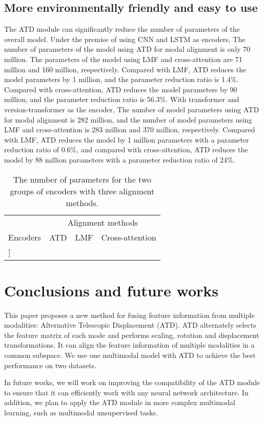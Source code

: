 \documentclass{ecai}
\begin{document}
\subsection{More environmentally friendly and easy to use}
The ATD module can significantly reduce the number of parameters of the overall model. Under the premise of using CNN and LSTM as encoders, The number of parameters of the model using ATD for modal alignment is only 70 million. The parameters of the model using LMF and cross-attention are 71 million and 160 million, respectively. Compared with LMF, ATD reduces the model parameters by 1 million, and the parameter reduction ratio is 1.4\%. Compared with cross-attention, ATD reduces the model parameters by 90 million, and the parameter reduction ratio is 56.3\%. With transformer and version-transformer as the encoder, The number of model parameters using ATD for modal alignment is 282 million, and the number of model parameters using LMF and cross-attention is 283 million and 370 million, respectively. Compared with LMF, ATD reduces the model by 1 million parameters with a parameter reduction ratio of 0.6\%, and compared with cross-attention, ATD reduces the model by 88 million parameters with a parameter reduction ratio of 24\%.
\begin{table}
\begin{center}
{\caption{The number of parameters for the two groups of encoders with three alignment methods.}\label{table3}}
\begin{tabular}{lccc}
\hline
\rule{0pt}{12pt}
&\multicolumn{3}{c}{Alignment methods}\\
\cline{2-4}
\rule{0pt}{12pt}
Encoders &ATD &LMF &Cross-attention
\\
\hline
\-6pt]

\end{tabular}
\end{center}
\end{table}


\section{Conclusions and future works}
This paper proposes a new method for fusing feature information from multiple modalities: Alternative Telescopic Displacement (ATD). ATD alternately selects the feature matrix of each mode and performs scaling, rotation and displacement transformations. It can align the feature information of multiple modalities in a common subspace. We use one multimodal model with ATD to achieve the best performance on two datasets.

In future works, we will work on improving the compatibility of the ATD module to ensure that it can efficiently work with any neural network architecture. In addition, we plan to apply the ATD module in more complex multimodal learning, such as multimodal unsupervised tasks.






\end{document}
